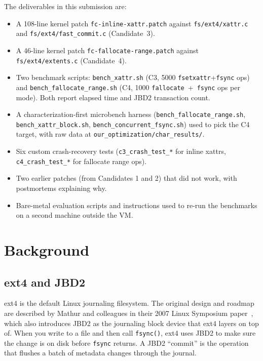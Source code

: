 \documentclass[11pt,a4paper]{article}
\begin{document}
The deliverables in this submission are:
\begin{itemize}[leftmargin=*]
  \item A 108-line kernel patch \texttt{fc-inline-xattr.patch}
        against \texttt{fs/ext4/xattr.c} and
        \texttt{fs/ext4/fast\_commit.c} (Candidate~3).
  \item A 46-line kernel patch \texttt{fc-fallocate-range.patch}
        against \texttt{fs/ext4/extents.c} (Candidate~4).
  \item Two benchmark scripts: \texttt{bench\_xattr.sh} (C3, 5000
        \texttt{fsetxattr}+\texttt{fsync} ops) and
        \texttt{bench\_fallocate\_range.sh} (C4, 1000
        \texttt{fallocate}~+~\texttt{fsync} ops per mode). Both
        report elapsed time and JBD2 transaction count.
  \item A characterization-first microbench harness
        (\texttt{bench\_fallocate\_range.sh},
        \texttt{bench\_xattr\_block.sh},
        \texttt{bench\_concurrent\_fsync.sh}) used to pick the C4
        target, with raw data at
        \texttt{our\_optimization/char\_results/}.
  \item Six custom crash-recovery tests (\texttt{c3\_crash\_test\_*}
        for inline xattrs, \texttt{c4\_crash\_test\_*} for fallocate
        range ops).
  \item Two earlier patches (from Candidates 1 and 2) that did not
        work, with postmortems explaining why.
  \item Bare-metal evaluation scripts and instructions used to
        re-run the benchmarks on a second machine outside the VM.
\end{itemize}

\section{Background}

\subsection{ext4 and JBD2}

ext4 is the default Linux journaling filesystem. The original
design and roadmap are described by Mathur and colleagues in their
2007 Linux Symposium paper~\cite{ext4-design}, which also
introduces JBD2 as the journaling block device that ext4 layers on
top of. When you write to a file and then call \texttt{fsync()},
ext4 uses JBD2 to make sure the change is on disk before
\texttt{fsync} returns. A JBD2 ``commit'' is the operation that
flushes a batch of metadata changes through the journal.
\end{document}
